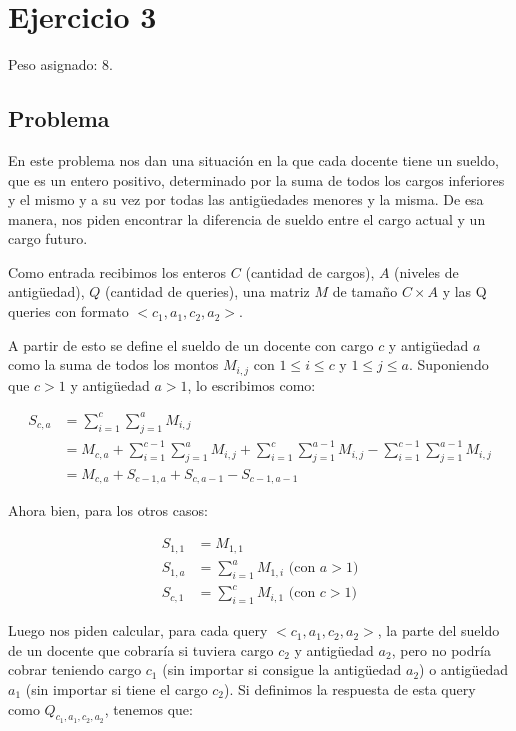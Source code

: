 \section{Ejercicio 3}

Peso asignado: 8.

\subsection{Problema}

En este problema nos dan una situación en la que cada docente tiene un sueldo, que es un entero positivo, determinado por la suma de
todos los cargos inferiores y el mismo y a su vez por todas las antigüedades menores y la misma. De esa manera, nos piden encontrar
la diferencia de sueldo entre el cargo actual y un cargo futuro.

Como entrada recibimos los enteros $C$ (cantidad de cargos), $A$ (niveles de antigüedad), $Q$ (cantidad de queries), una matriz $M$
de tamaño $C \times A$ y las Q queries con formato $<c_1, a_1, c_2, a_2>$.

A partir de esto se define el sueldo de un docente con cargo $c$ y antigüedad $a$ como la suma de
todos los montos $M_{i,j}$ con $1 \leq i \leq c$ y $1 \leq j \leq a$. Suponiendo que $c > 1$ y
antigüedad $a > 1$, lo escribimos como:

\begin{equation*}
\begin{split}
    S_{c,a} & = \sum_{i=1}^{c}{\sum_{j=1}^{a}{M_{i,j}}} \\
    		& = M_{c,a} + \sum_{i=1}^{c-1}{\sum_{j=1}^{a}{M_{i,j}}} + 
    		\sum_{i=1}^{c}{\sum_{j=1}^{a-1}{M_{i,j}}} - 
    		\sum_{i=1}^{c-1}{\sum_{j=1}^{a-1}{M_{i,j}}} \\
    		& = M_{c,a} + S_{c-1,a} + S_{c,a-1} - S_{c-1,a-1}
\end{split}
\end{equation*}

Ahora bien, para los otros casos:

\begin{equation*}
\begin{split}
    S_{1,1} & = M_{1,1} \\
    S_{1,a} & = \sum_{i=1}^{a}{M_{1,i}} \text{   (con $a > 1$)} \\
    S_{c,1} & = \sum_{i=1}^{c}{M_{i,1}} \text{   (con $c > 1$)}
\end{split}
\end{equation*}

Luego nos piden calcular, para cada query $<c_1, a_1, c_2, a_2>$, la parte del sueldo de un docente que
cobraría si tuviera cargo $c_2$ y antigüedad $a_2$, pero no podría cobrar teniendo cargo $c_1$ (sin importar
si consigue la antigüedad $a_2$) o antigüedad $a_1$ (sin importar si tiene el cargo $c_2$). Si definimos la
respuesta de esta query como $Q_{c_1,a_1,c_2,a_2}$, tenemos que: 

